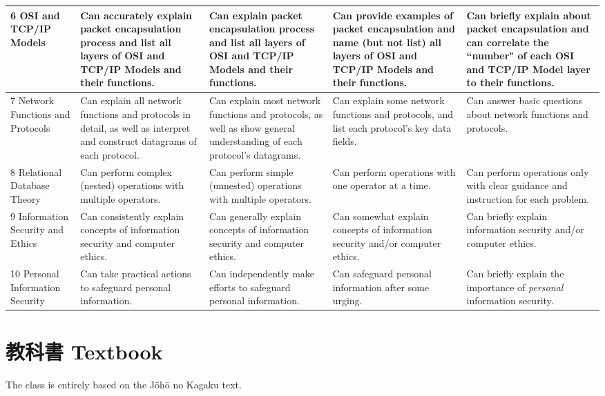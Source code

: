 \documentclass{article}
\begin{document}
\begin{landscape}
\begin{longtable}{|p{3.0cm}|p{4cm}|p{4cm}|p{4cm}|p{4cm}|}
\\
\hline
6 OSI and TCP/IP Models &
  Can accurately explain packet encapsulation process and list all layers of OSI and TCP/IP Models and their functions. &
  Can explain packet encapsulation process and list all layers of OSI and TCP/IP Models and their functions. &
  Can provide examples of packet encapsulation and name (but not list) all layers of OSI and TCP/IP Models and their functions. &
  Can briefly explain about packet encapsulation and can correlate the ``number" of each OSI and TCP/IP Model layer to their functions.
\\
\hline
7 Network Functions and Protocols &
  Can explain all network functions and protocols in detail, as well as interpret and construct datagrams of each protocol. &
  Can explain most network functions and protocols, as well as show general understanding of each protocol's datagrams. &
  Can explain some network functions and protocols, and list each protocol's key data fields. &
  Can answer basic questions about network functions and protocols.
\\
\hline
8 Relational Database Theory &
  Can perform complex (nested) operations with multiple operators. &
  Can perform simple (unnested) operations with multiple operators. &
  Can perform operations with one operator at a time. &
  Can perform operations only with clear guidance and instruction for each problem.
\\
\hline
9 Information Security and Ethics &
  Can consistently explain concepts of information security and computer ethics. &
  Can generally explain concepts of information security and computer ethics. &
  Can somewhat explain concepts of information security and/or computer ethics. &
  Can briefly explain information security and/or computer ethics.
\\
\hline
10 Personal Information Security &
  Can take practical actions to safeguard personal information. &
  Can independently make efforts to safeguard personal information. &
  Can safeguard personal information after some urging. &
  Can briefly explain the importance of \textit{personal} information security.
\\
\hline

\end{longtable}

\end{landscape}

\section{教科書 Textbook}
The class is entirely based on the J\={o}h\={o} no Kagaku text. 
\end{document}
